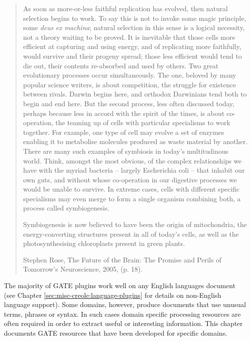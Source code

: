 
\nnormalsize
\begin{quote}
As soon as more-or-less faithful replication has evolved, then natural
selection begins to work. To say this is not to invoke some magic principle,
some {\it deus ex machina}; natural selection in this sense is a logical necessity,
not a theory waiting to be proved. It is inevitable that those cells more
efficient at capturing and using energy, and of replicating more faithfully,
would survive and their progeny spread; those less efficient would tend to die
out, their contents re-absorbed and used by others. Two great evolutionary
processes occur simultaneously. The one, beloved by many popular science
writers, is about competition, the struggle for existence between rivals.
Darwin begins here, and orthodox Darwinians tend both to begin and end here.
But the second process, less often discussed today, perhaps because less in
accord with the spirit of the times, is about co-operation, the teaming up of
cells with particular specialisms to work together. For example, one type of
cell may evolve a set of enzymes enabling it to metabolise molecules produced
as waste material by another. There are many such examples of symbiosis in
today's multitudinous world. Think, amongst the most obvious, of the complex
relationships we have with the myriad bacteria -- largely Escherichia coli --
that inhabit our own guts, and without whose co-operation in our digestive
processes we would be unable to survive. In extreme cases, cells with
different specific specialisms may even merge to form a single organism
combining both, a process called symbiogenesis.

Symbiogenesis is now believed to have been the origin of mitochondria,
the energy-converting structures present in all of today's cells, as well
as the photosynthesising chloroplasts present in green plants.

Stephen Rose, The Future of the Brain: The Promise and Perils of Tomorrow's
Neuroscience, 2005, (p. 18).
\end{quote}

The majority of GATE plugins work well on any English languages document (see Chapter
\ref{sec:misc-creole:language-plugins} for details on non-English language support).
Some domains, however, produce documents that use unusual terms, phrases or syntax.
In such cases domain specific processing resources are often required in order to
extract useful or interesting information. This chapter documents GATE resources
that have been developed for specific domains.


